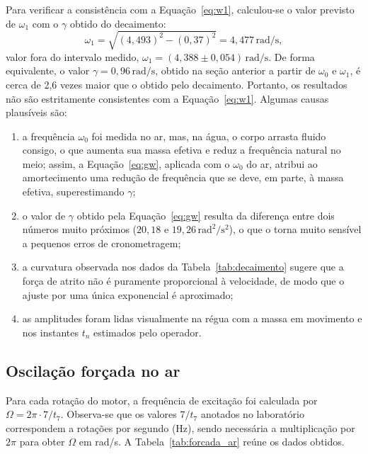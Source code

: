 \documentclass[12pt, a4paper]{article}
\newcommand{\un}[1]{\,\mathrm{#1}}
\begin{document}
Para verificar a consistência com a Equação~\eqref{eq:w1}, calculou-se o valor previsto de $\omega_1$ com o $\gamma$ obtido do decaimento:
\[
\omega_1=\sqrt{(4{,}493)^2-(0{,}37)^2}=4{,}477\un{rad/s},
\]
valor fora do intervalo medido, $\omega_1=(4{,}388\pm0{,}054)\un{rad/s}$. De forma equivalente, o valor $\gamma=0{,}96\un{rad/s}$, obtido na seção anterior a partir de $\omega_0$ e $\omega_1$, é cerca de 2,6 vezes maior que o obtido pelo decaimento. Portanto, os resultados não são estritamente consistentes com a Equação~\eqref{eq:w1}. Algumas causas plausíveis são:
\begin{enumerate}
    \item a frequência $\omega_0$ foi medida no ar, mas, na água, o corpo arrasta fluido consigo, o que aumenta sua massa efetiva e reduz a frequência natural no meio; assim, a Equação~\eqref{eq:gw}, aplicada com o $\omega_0$ do ar, atribui ao amortecimento uma redução de frequência que se deve, em parte, à massa efetiva, superestimando $\gamma$;
    \item o valor de $\gamma$ obtido pela Equação~\eqref{eq:gw} resulta da diferença entre dois números muito próximos ($20{,}18$ e $19{,}26\un{rad^2/s^2}$), o que o torna muito sensível a pequenos erros de cronometragem;
    \item a curvatura observada nos dados da Tabela~\ref{tab:decaimento} sugere que a força de atrito não é puramente proporcional à velocidade, de modo que o ajuste por uma única exponencial é aproximado;
    \item as amplitudes foram lidas visualmente na régua com a massa em movimento e nos instantes $t_n$ estimados pelo operador.
\end{enumerate}

\subsection{Oscilação forçada no ar}

Para cada rotação do motor, a frequência de excitação foi calculada por $\Omega=2\pi\cdot7/t_7$. Observa-se que os valores $7/t_7$ anotados no laboratório correspondem a rotações por segundo (Hz), sendo necessária a multiplicação por $2\pi$ para obter $\Omega$ em rad/s. A Tabela~\ref{tab:forcada_ar} reúne os dados obtidos.
\end{document}
